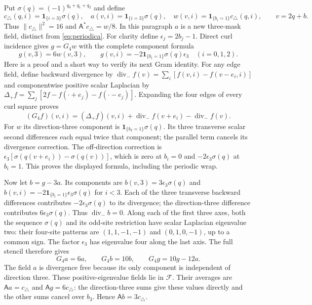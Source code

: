 \documentclass[11pt]{article}
\begin{document}
Put $\sigma(q)=(-1)^{q_0+q_1+q_2}$ and define
\[
 c_\triangle(q,i)=\mathbf1_{\{i=3\}}\sigma(q),\quad
 a(v,i)=\mathbf1_{\{i=3\}}\sigma(q),\quad
 w(v,i)=\mathbf1_{\{b_i=1\}}c_\triangle(q,i),\qquad v=2q+b.
\]
Thus $\|c_\triangle\|^2=16$ and
$\mathsf A^*c_\triangle=w/8$. In this paragraph $a$ is a new
three-mask field, distinct from \eqref{eq:periodica}.
For clarity define $\epsilon_j=2b_j-1$. Direct curl incidence gives
$g=G_4w$ with the complete component formula
\[
 g(v,3)=6w(v,3),\qquad
 g(v,i)=-2\mathbf1_{\{b_i=1\}}\sigma(q)\epsilon_3
            \quad(i=0,1,2).
\]
Here is a proof and a short way to verify its next Gram identity.
For any edge field, define backward divergence by
$\operatorname{div}_{-}f(v)=\sum_i[f(v,i)-f(v-e_i,i)]$ and
componentwise positive scalar Laplacian by
$\Delta_+f=\sum_j[2f-f(\cdot+e_j)-f(\cdot-e_j)]$.
Expanding the four edges of every curl square proves
\[
 (G_4f)(v,i)=(\Delta_+f)(v,i)
       +\operatorname{div}_{-}f(v+e_i)-\operatorname{div}_{-}f(v).
\]
For $w$ its direction-three component is
$\mathbf1_{\{b_3=1\}}\sigma(q)$. Its three transverse scalar
second differences each equal twice that component; the parallel
term cancels its divergence correction. The off-direction
correction is
$\epsilon_3[\sigma(q(v+e_i))-\sigma(q(v))]$,
which is zero at $b_i=0$ and $-2\epsilon_3\sigma(q)$ at $b_i=1$.
This proves the displayed formula, including the periodic wrap.

Now let $b=g-3a$. Its components are
$b(v,3)=3\epsilon_3\sigma(q)$ and
$b(v,i)=-2\mathbf1_{\{b_i=1\}}\epsilon_3\sigma(q)$ for $i<3$.
Each of the three transverse backward differences contributes
$-2\epsilon_3\sigma(q)$ to its divergence; the direction-three
difference contributes $6\epsilon_3\sigma(q)$. Thus
$\operatorname{div}_{-}b=0$. Along each of the first three axes,
both the sequence $\sigma(q)$ and its odd-site restriction have
scalar Laplacian eigenvalue two: their four-site patterns are
$(1,1,-1,-1)$ and $(0,1,0,-1)$, up to a common sign.
The factor $\epsilon_3$ has eigenvalue four along the last axis.
The full stencil therefore gives
\[
 G_4a=6a,\qquad G_4b=10b,\qquad G_4g=10g-12a.
\]
The field $a$ is divergence free because its only component is
independent of direction three. These positive-eigenvalue fields
lie in $\mathcal F$. Their averages are
$\mathsf A a=c_\triangle$ and $\mathsf A g=6c_\triangle$:
the direction-three sums give these values directly and the other
sums cancel over $b_3$. Hence $\mathsf A b=3c_\triangle$.
\end{document}
